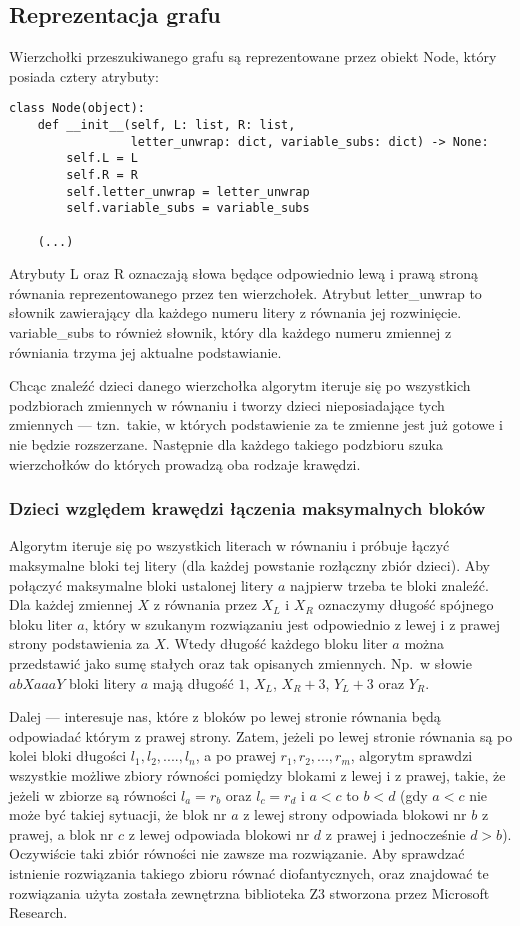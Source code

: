 \documentclass[leqno, 12pt]{article}
\begin{document}
\subsection{Reprezentacja grafu}
Wierzchołki przeszukiwanego grafu są reprezentowane przez obiekt Node, który posiada cztery atrybuty:
\begin{verbatim}
class Node(object):
    def __init__(self, L: list, R: list, 
                 letter_unwrap: dict, variable_subs: dict) -> None:
        self.L = L
        self.R = R
        self.letter_unwrap = letter_unwrap
        self.variable_subs = variable_subs

    (...)
\end{verbatim}
Atrybuty L oraz R oznaczają słowa będące odpowiednio lewą i prawą stroną równania reprezentowanego przez ten wierzchołek. Atrybut letter\_unwrap to słownik zawierający dla każdego numeru litery z równania jej rozwinięcie. variable\_subs to również słownik, który dla każdego numeru zmiennej z równiania trzyma jej aktualne podstawianie.


Chcąc znaleźć dzieci danego wierzchołka algorytm iteruje się po wszystkich podzbiorach zmiennych w równaniu i tworzy dzieci nieposiadające tych zmiennych --- tzn.\ takie, w których podstawienie za te zmienne jest już gotowe i nie będzie rozszerzane. Następnie dla każdego takiego podzbioru szuka wierzchołków do których prowadzą oba rodzaje krawędzi.

\subsubsection*{Dzieci względem krawędzi łączenia maksymalnych bloków}
Algorytm iteruje się po wszystkich literach w równaniu i próbuje łączyć maksymalne bloki tej litery (dla każdej powstanie rozłączny zbiór dzieci).
Aby połączyć maksymalne bloki ustalonej litery $a$ najpierw trzeba te bloki znaleźć. Dla każdej zmiennej $X$ z równania przez $X_L$ i $X_R$ oznaczymy długość spójnego bloku liter $a$, który w szukanym rozwiązaniu jest odpowiednio z lewej i z prawej strony podstawienia za $X$. Wtedy długość każdego bloku liter $a$ można przedstawić jako sumę stałych oraz tak opisanych zmiennych. Np.\ w słowie $abXaaaY$ bloki litery $a$ mają długość $1$, $X_L$, $X_R + 3$, $Y_L + 3$ oraz $Y_R$.

Dalej --- interesuje nas, które z bloków po lewej stronie równania będą odpowiadać którym z prawej strony. Zatem, jeżeli po lewej stronie równania są po kolei bloki długości $l_1, l_2, ...., l_n$, a po prawej $r_1, r_2, ..., r_m$, algorytm sprawdzi wszystkie możliwe zbiory równości pomiędzy blokami z lewej i z prawej, takie, że jeżeli w zbiorze są równości $l_a = r_b$ oraz $l_c = r_d$ i $a < c$ to $b < d$ (gdy $a < c$ nie może być takiej sytuacji, że blok nr $a$ z lewej strony odpowiada blokowi nr $b$ z prawej, a blok nr $c$ z lewej odpowiada blokowi nr $d$ z prawej i jednocześnie $d > b$). Oczywiście taki zbiór równości nie zawsze ma rozwiązanie. Aby sprawdzać istnienie rozwiązania takiego zbioru równać diofantycznych, oraz znajdować te rozwiązania użyta została zewnętrzna biblioteka Z3 stworzona przez Microsoft Research.
\end{document}
